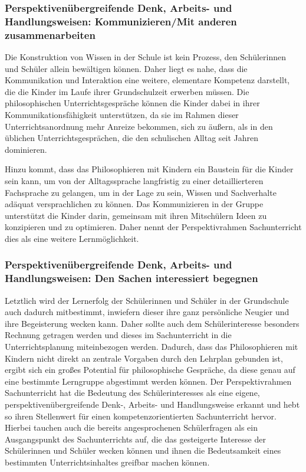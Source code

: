 \subsubsection{Perspektivenübergreifende Denk, Arbeits- und Handlungsweisen: Kommunizieren/Mit anderen zusammenarbeiten}


Die Konstruktion von Wissen in der Schule ist kein Prozess, den Schülerinnen und Schüler allein bewältigen können. 
Daher liegt es nahe, dass die Kommunikation und Interaktion eine weitere, elementare Kompetenz darstellt, die die Kinder im Laufe ihrer Grundschulzeit erwerben müssen.
 Die philosophischen Unterrichtsgespräche können die Kinder dabei in ihrer Kommunikationsfähigkeit unterstützen, da sie im Rahmen dieser Unterrichtsanordnung mehr Anreize bekommen, sich zu äußern, als in den üblichen Unterrichtsgesprächen, die den schulischen Alltag seit Jahren dominieren.

Hinzu kommt, dass das Philosophieren mit Kindern ein Baustein für die Kinder sein kann, um von der Alltagssprache langfristig zu einer detaillierteren Fachsprache zu gelangen, um in der Lage zu sein, Wissen und Sachverhalte adäquat versprachlichen zu können\cite[S.\,24]{GDS13}.
Das Kommunizieren in der Gruppe unterstützt die Kinder darin, gemeinsam mit ihren Mitschülern Ideen zu konzipieren und zu optimieren. Daher nennt der Perspektivrahmen Sachunterricht dies als eine weitere Lernmöglichkeit.

\subsubsection{Perspektivenübergreifende Denk, Arbeits- und Handlungsweisen: Den Sachen interessiert begegnen}


Letztlich wird der Lernerfolg der Schülerinnen und Schüler in der Grundschule auch dadurch mitbestimmt, inwiefern dieser ihre ganz persönliche Neugier und ihre Begeisterung wecken kann. 
Daher sollte auch dem Schülerinteresse besonders Rechnung getragen werden und dieses im Sachunterricht in die Unterrichtsplanung miteinbezogen werden.
 Dadurch, dass das Philosophieren mit Kindern nicht direkt an zentrale Vorgaben durch den Lehrplan gebunden ist, ergibt sich ein großes Potential für philosophische Gespräche, da diese genau auf eine bestimmte Lerngruppe abgestimmt werden können. 
Der Perspektivrahmen Sachunterricht hat die Bedeutung des Schülerinteresses als eine eigene, perspektivenübergreifende Denk-, Arbeits- und Handlungsweise erkannt und hebt so ihren Stellenwert für einen kompetenzorientierten Sachunterricht hervor. 
Hierbei tauchen auch die bereits angesprochenen Schülerfragen als ein Ausgangspunkt des Sachunterrichts auf, die das gesteigerte Interesse der Schülerinnen und Schüler wecken können und ihnen die Bedeutsamkeit eines bestimmten Unterrichtsinhaltes greifbar machen können. 

